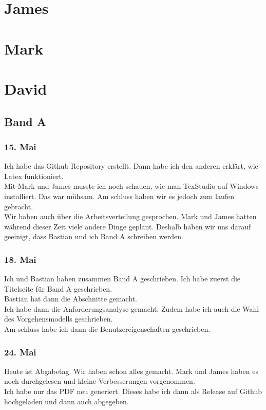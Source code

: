 \documentclass[10pt]{article}
\begin{document}
			
			
	\section{James}
	
	\section{Mark}
	\section{David}
	\subsection{Band A}
	\subsubsection{15. Mai}
	Ich habe das Github Repository erstellt. Dann habe ich den anderen erklärt, wie Latex funktioniert.\\
	Mit Mark und James musste ich noch schauen, wie man TexStudio auf Windows installiert. Das war mühsam. Am schluss haben wir es jedoch zum laufen gebracht.\\
	Wir haben auch über die Arbeitsverteilung gesprochen. Mark und James hatten während dieser Zeit viele andere Dinge geplant. Deshalb haben wir uns darauf geeinigt, dass Bastian und ich Band A schreiben werden.\\
	\subsubsection{18. Mai}
	Ich und Bastian haben zusammen Band A geschrieben. Ich habe zuerst die Titelseite für Band A geschrieben.\\
	Bastian hat dann die Abschnitte gemacht.\\
	Ich habe dann die Anforderungsanalyse gemacht. Zudem habe ich auch die Wahl des Vorgehensmodells geschrieben.\\
	Am schluss habe ich dann die Benutzereigenschaften geschrieben.
	\subsubsection{24. Mai}
	Heute ist Abgabetag. Wir haben schon alles gemacht. Mark und James haben es noch durchgelesen und kleine Verbesserungen vorgenommen.\\
	Ich habe nur das PDF neu generiert. Dieses habe ich dann als Release auf Github hochgeladen und dann auch abgegeben.
\end{document}
